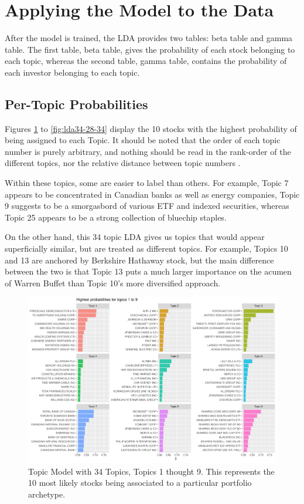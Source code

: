 \section{Applying the Model to the Data}

After the model is trained, the LDA provides two tables: beta table and gamma table. The first table, beta table, gives the probability of each stock belonging to each topic, whereas the second table, gamma table, contains the probability of each investor belonging to each topic. 


\subsection{Per-Topic Probabilities}

Figures \ref{fig:lda34-1-9} to \ref{fig:lda34-28-34} display the 10 stocks with the highest probability of being assigned to each Topic.  It should be noted that the order of each topic number is purely arbitrary, and nothing should be read in the rank-order of the different topics, nor the relative distance between topic numbers \citep{Silge2018}.  

Within these topics, some are easier to label than others.  For example, Topic 7 appears to be concentrated in Canadian banks as well as energy companies, Topic 9 suggests to be a smorgasbord of various ETF and indexed securities, whereas Topic 25 appears to be a strong collection of bluechip staples.  

On the other hand, this 34 topic LDA gives us topics that would appear superficially similar, but are treated as different topics.  For example, Topics 10 and 13 are anchored by Berkshire Hathaway stock, but the main difference between the two is that Topic 13 puts a much larger importance on the acumen of Warren Buffet than Topic 10's more diversified approach.  

\begin{figure}
	\centering
	\includegraphics[width=\linewidth]{Figures/ChapterV/LDA34_1-9}
	\caption[Topic Model with 34 Topics, Topics 1 thought 9]{Topic Model with 34 Topics, Topics 1 thought 9. This represents the 10 most likely stocks being associated to a particular portfolio archetype.}
	\label{fig:lda34-1-9}
\end{figure}

